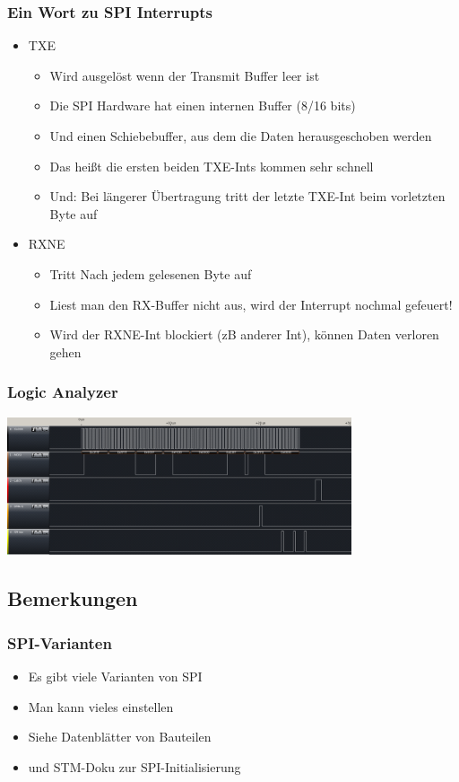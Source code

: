\documentclass[ngerman,compress]{beamer}
\begin{document}
\begin{frame} [fragile]
	\frametitle{Ein Wort zu SPI Interrupts}
	\begin{itemize}
		\item TXE
		\begin{itemize}
		\item Wird ausgelöst wenn der Transmit Buffer leer ist
		\item Die SPI Hardware hat einen internen Buffer (8/16 bits)
		\item Und einen Schiebebuffer, aus dem die Daten herausgeschoben werden
		\item Das heißt die ersten beiden TXE-Ints kommen sehr schnell
		\item Und: Bei längerer Übertragung tritt der letzte TXE-Int beim vorletzten Byte auf
		\end{itemize}
		\item RXNE
		\begin{itemize}
		\item Tritt Nach jedem gelesenen Byte auf
		\item Liest man den RX-Buffer nicht aus, wird der Interrupt nochmal gefeuert!
		\item Wird der RXNE-Int blockiert (zB anderer Int), können Daten verloren gehen
		\end{itemize}
	\end{itemize}
\end{frame}

\begin{frame} [fragile]
	\frametitle{Logic Analyzer}
        \includegraphics[width=4in]{dump_dma_spi_with_ints.png}
\end{frame}


\subsection{Bemerkungen}

\begin{frame} [fragile]
	\frametitle{SPI-Varianten}
	\begin{itemize}
		\item Es gibt viele Varianten von SPI
		\item Man kann vieles einstellen
		\item Siehe Datenblätter von Bauteilen
		\item und STM-Doku zur SPI-Initialisierung
	\end{itemize}
\end{frame}
\end{document}
